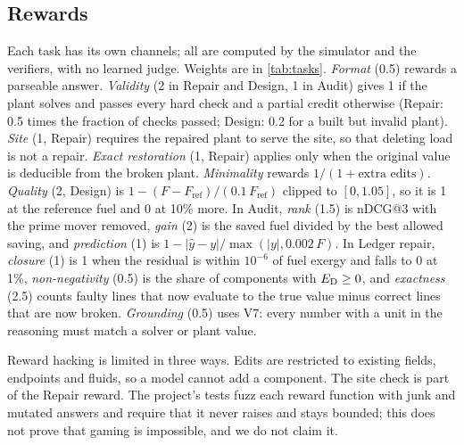 \subsection{Rewards}\label{sec:rewards}

Each task has its own channels; all are computed by the simulator and the verifiers, with no learned judge. Weights are in
\cref{tab:tasks}. \emph{Format} (0.5) rewards a parseable answer. \emph{Validity} (2 in Repair and Design, 1 in Audit) gives 1 if the plant
solves and passes every hard check and a partial credit otherwise (Repair: 0.5 times the fraction of checks passed; Design: 0.2 for a built but invalid plant).
\emph{Site} (1, Repair) requires the repaired plant to serve the site, so that deleting load is not a repair. \emph{Exact restoration} (1, Repair) applies only when the
original value is deducible from the broken plant. \emph{Minimality} rewards $1/(1+\text{extra edits})$. \emph{Quality} (2, Design) is
$1-(F-F_{\mathrm{ref}})/(0.1\,F_{\mathrm{ref}})$ clipped to $[0,1.05]$, so it is 1 at the reference fuel and 0 at 10\% more. In Audit, \emph{rank} (1.5) is nDCG@3 with the prime mover
removed, \emph{gain} (2) is the saved fuel divided by the best allowed saving, and \emph{prediction} (1) is
$1-|\hat y-y|/\max(|y|,0.002\,F)$. In Ledger repair, \emph{closure} (1) is 1 when the residual is within $10^{-6}$ of fuel exergy and falls to 0 at 1\%, \emph{non-negativity} (0.5) is the
share of components with $E_{\mathrm{D}}\ge0$, and \emph{exactness} (2.5) counts faulty lines that now evaluate to the true value minus correct lines that are now broken. \emph{Grounding} (0.5) uses V7: every
number with a unit in the reasoning must match a solver or plant value.

Reward hacking is limited in three ways. Edits are restricted to existing fields, endpoints and fluids, so a model cannot add a component. The site check is part of the
Repair reward. The project's tests fuzz each reward function with junk and mutated answers and require that it never raises and stays bounded; this does not prove that
gaming is impossible, and we do not claim it.

